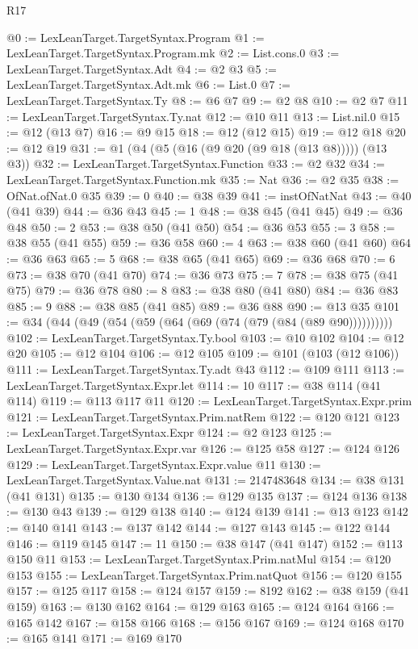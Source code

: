 \begin{lexlean}{R17}
\begin{coremodule}
@0 := LexLeanTarget.TargetSyntax.Program
@1 := LexLeanTarget.TargetSyntax.Program.mk
@2 := List.cons.{0}
@3 := LexLeanTarget.TargetSyntax.Adt
@4 := @2 @3
@5 := LexLeanTarget.TargetSyntax.Adt.mk
@6 := List.{0}
@7 := LexLeanTarget.TargetSyntax.Ty
@8 := @6 @7
@9 := @2 @8
@10 := @2 @7
@11 := LexLeanTarget.TargetSyntax.Ty.nat
@12 := @10 @11
@13 := List.nil.{0}
@15 := @12 (@13 @7)
@16 := @9 @15
@18 := @12 (@12 @15)
@19 := @12 @18
@20 := @12 @19
@31 := @1 (@4 (@5 (@16 (@9 @20 (@9 @18 (@13 @8))))) (@13 @3))
@32 := LexLeanTarget.TargetSyntax.Function
@33 := @2 @32
@34 := LexLeanTarget.TargetSyntax.Function.mk
@35 := Nat
@36 := @2 @35
@38 := OfNat.ofNat.{0} @35
@39 := 0
@40 := @38 @39
@41 := instOfNatNat
@43 := @40 (@41 @39)
@44 := @36 @43
@45 := 1
@48 := @38 @45 (@41 @45)
@49 := @36 @48
@50 := 2
@53 := @38 @50 (@41 @50)
@54 := @36 @53
@55 := 3
@58 := @38 @55 (@41 @55)
@59 := @36 @58
@60 := 4
@63 := @38 @60 (@41 @60)
@64 := @36 @63
@65 := 5
@68 := @38 @65 (@41 @65)
@69 := @36 @68
@70 := 6
@73 := @38 @70 (@41 @70)
@74 := @36 @73
@75 := 7
@78 := @38 @75 (@41 @75)
@79 := @36 @78
@80 := 8
@83 := @38 @80 (@41 @80)
@84 := @36 @83
@85 := 9
@88 := @38 @85 (@41 @85)
@89 := @36 @88
@90 := @13 @35
@101 := @34 (@44 (@49 (@54 (@59 (@64 (@69 (@74 (@79 (@84 (@89 @90))))))))))
@102 := LexLeanTarget.TargetSyntax.Ty.bool
@103 := @10 @102
@104 := @12 @20
@105 := @12 @104
@106 := @12 @105
@109 := @101 (@103 (@12 @106))
@111 := LexLeanTarget.TargetSyntax.Ty.adt @43
@112 := @109 @111
@113 := LexLeanTarget.TargetSyntax.Expr.let
@114 := 10
@117 := @38 @114 (@41 @114)
@119 := @113 @117 @11
@120 := LexLeanTarget.TargetSyntax.Expr.prim
@121 := LexLeanTarget.TargetSyntax.Prim.natRem
@122 := @120 @121
@123 := LexLeanTarget.TargetSyntax.Expr
@124 := @2 @123
@125 := LexLeanTarget.TargetSyntax.Expr.var
@126 := @125 @58
@127 := @124 @126
@129 := LexLeanTarget.TargetSyntax.Expr.value @11
@130 := LexLeanTarget.TargetSyntax.Value.nat
@131 := 2147483648
@134 := @38 @131 (@41 @131)
@135 := @130 @134
@136 := @129 @135
@137 := @124 @136
@138 := @130 @43
@139 := @129 @138
@140 := @124 @139
@141 := @13 @123
@142 := @140 @141
@143 := @137 @142
@144 := @127 @143
@145 := @122 @144
@146 := @119 @145
@147 := 11
@150 := @38 @147 (@41 @147)
@152 := @113 @150 @11
@153 := LexLeanTarget.TargetSyntax.Prim.natMul
@154 := @120 @153
@155 := LexLeanTarget.TargetSyntax.Prim.natQuot
@156 := @120 @155
@157 := @125 @117
@158 := @124 @157
@159 := 8192
@162 := @38 @159 (@41 @159)
@163 := @130 @162
@164 := @129 @163
@165 := @124 @164
@166 := @165 @142
@167 := @158 @166
@168 := @156 @167
@169 := @124 @168
@170 := @165 @141
@171 := @169 @170

\end{coremodule}
\end{lexlean}

